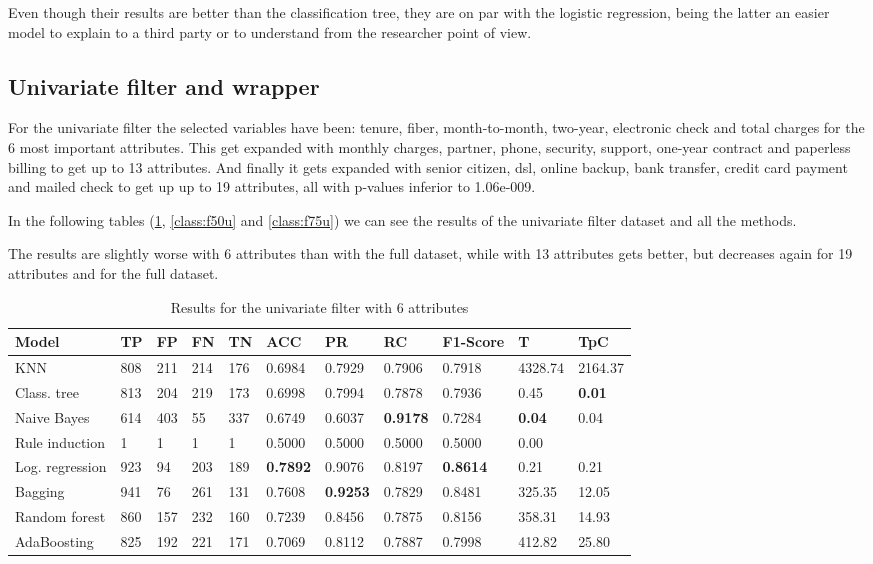 \documentclass[a4paper,11pt]{article}
\begin{document}
Even though their results are better than the classification tree, they are on par with the logistic regression, being the latter an easier model to explain to a third party or to understand from the researcher point of view.

\subsection{Univariate filter and wrapper}

For the univariate filter the selected variables have been: tenure, fiber, month-to-month, two-year, electronic check and total charges for the 6 most important attributes. This get expanded with monthly charges, partner, phone, security, support, one-year contract and paperless billing to get up to 13 attributes. And finally it gets expanded with senior citizen, dsl, online backup, bank transfer, credit card payment and mailed check to get up up to 19 attributes, all with p-values inferior to 1.06e-009.

In the following tables (\ref{class:f25u}, \ref{class:f50u} and \ref{class:f75u}) we can see the results of the univariate filter dataset and all the methods.

The results are slightly worse with 6 attributes than with the full dataset, while with 13 attributes gets better, but decreases again for 19 attributes and for the full dataset.

\begin{table}
\centering
\begin{tabular}{|l|l|l|l|l|l|l|l|l|l|l|}
\hline

\textbf{Model} & \textbf{TP} & \textbf{FP} & \textbf{FN} & \textbf{TN} & \textbf{ACC} & \textbf{PR} & \textbf{RC} & \textbf{F1-Score} & \textbf{T} & \textbf{TpC} \\ \hline
KNN & 808 & 211 & 214 & 176 & 0.6984 & 0.7929 & 0.7906 & 0.7918 & 4328.74 & 2164.37 \\ \hline
Class. tree & 813 & 204 & 219 & 173 & 0.6998 & 0.7994 & 0.7878 & 0.7936 & 0.45 & \textbf{0.01} \\ \hline
Naive Bayes & 614 & 403 & 55 & 337 & 0.6749 & 0.6037 & \textbf{0.9178} & 0.7284 & \textbf{0.04} & 0.04 \\ \hline
Rule induction & 1 & 1 & 1 & 1 & 0.5000 & 0.5000 & 0.5000 & 0.5000 & 0.00 \\ \hline
Log. regression & 923 & 94 & 203 & 189 & \textbf{0.7892} & 0.9076 & 0.8197 & \textbf{0.8614} & 0.21 & 0.21 \\ \hline
Bagging & 941 & 76 & 261 & 131 & 0.7608 & \textbf{0.9253} & 0.7829 & 0.8481 & 325.35 & 12.05 \\ \hline
Random forest & 860 & 157 & 232 & 160 & 0.7239 & 0.8456 & 0.7875 & 0.8156 & 358.31 & 14.93 \\ \hline
AdaBoosting & 825 & 192 & 221 & 171 & 0.7069 & 0.8112 & 0.7887 & 0.7998 & 412.82 & 25.80 \\ \hline

\end{tabular}
\caption{Results for the univariate filter with 6 attributes}
\label{class:f25u}
\end{table}
\end{document}
